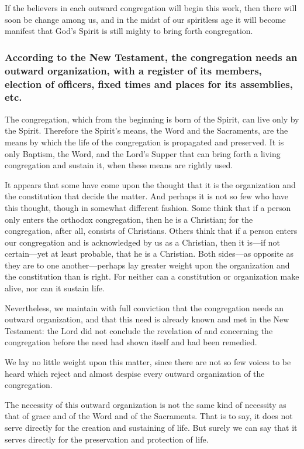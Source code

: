 If the believers in each outward congregation will begin this work, then there will soon be change among us, and in the midst of our spiritless age it will become manifest that God’s Spirit is still mighty to bring forth congregation.




\subsubsection{According to the New Testament, the congregation needs an outward organization, with a register of its members, election of officers, fixed times and places for its assemblies, etc.}

The congregation, which from the beginning is born of the Spirit, can live only by the Spirit. Therefore the Spirit’s means, the Word and the Sacraments, are the means by which the life of the congregation is propagated and preserved. It is only Baptism, the Word, and the Lord’s Supper that can bring forth a living congregation and sustain it, when these means are rightly used.

It appears that some have come upon the thought that it is the organization and the constitution that decide the matter. And perhaps it is not so few who have this thought, though in somewhat different fashion. Some think that if a person only enters the orthodox congregation, then he is a Christian; for the congregation, after all, consists of Christians. Others think that if a person enters our congregation and is acknowledged by us as a Christian, then it is—if not certain—yet at least probable, that he is a Christian. Both sides—as opposite as they are to one another—perhaps lay greater weight upon the organization and the constitution than is right. For neither can a constitution or organization make alive, nor can it sustain life.

Nevertheless, we maintain with full conviction that the congregation needs an outward organization, and that this need is already known and met in the New Testament: the Lord did not conclude the revelation of and concerning the congregation before the need had shown itself and had been remedied.

We lay no little weight upon this matter, since there are not so few voices to be heard which reject and almost despise every outward organization of the congregation.

The necessity of this outward organization is not the same kind of necessity as that of grace and of the Word and of the Sacraments. That is to say, it does not serve directly for the creation and sustaining of life. But surely we can say that it serves directly for the preservation and protection of life.

